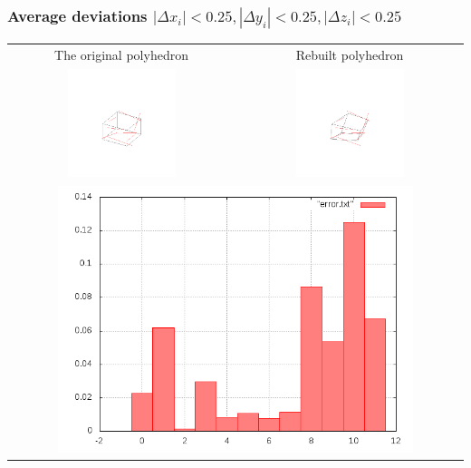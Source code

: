 \documentclass[11pt,fleqn,a4paper]{scrartcl}
\begin{document}
\subsubsection{Average deviations $|\Delta x_{i}|<0.25,|\Delta y_{i}|<0.25,|\Delta z_{i}|<0.25$}
\begin{center}

\begin{tabular}{|c|c|}
\hline
The original polyhedron& Rebuilt polyhedron \\
\includegraphics[width=0.5\textwidth]{variant2/images/21/input.png} &
\includegraphics[width=0.5\textwidth]{variant2/images/21/out.png} \\
\midrule
\multicolumn{2}{|c|}{ \includegraphics[width=0.8\textwidth]{variant2/images/21/error.png}} \\
\hline
\end{tabular}
\end{center}
\end{document}

